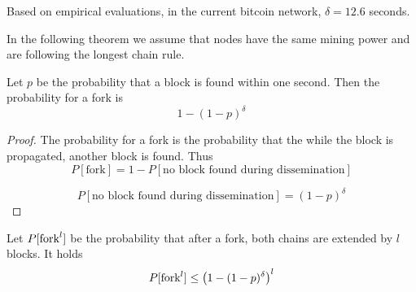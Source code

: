 \begin{note} Based on empirical evaluations, in the current bitcoin network, $\delta=12.6$ seconds. 
\end{note}

In the following theorem we assume that nodes have the same mining power and are following the longest chain rule.
\begin{theorem}
	Let $p$ be the probability that a block is found within one second.
	Then the probability for a fork is
	\[
		1-(1-p)^\delta
	\]
\end{theorem}
\begin{proof}
The probability for a fork is the probability that the while the block is propagated, another block is found.
Thus $$P[\text{fork}] = 1- P[\text{no block found during dissemination}]$$

$$P[\text{no block found during dissemination}] = (1-p)^\delta$$
\end{proof}

\begin{cor}Let $P[\textnormal{fork}^l]$ be the probability that after a fork, both chains are extended by $l$ blocks. It holds
	\[
		P[\textnormal{fork}^l] \leq \left(1-(1-p)^\delta\right)^l
	\]
	
\end{cor}

	